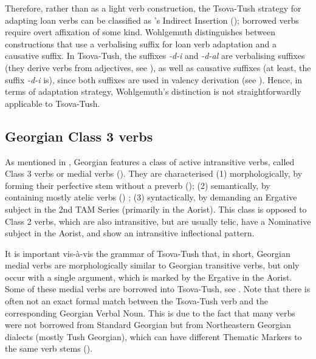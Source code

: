 Therefore, rather than as a light verb construction, the Tsova-Tush strategy for adapting loan verbs can be classified as \citeauthor{wohlgemut09loanverbtyp}'s Indirect Insertion (\citeyear[94]{wohlgemut09loanverbtyp}); borrowed verbs require overt affixation of some kind. Wohlgemuth distinguishes between constructions that use a verbalising suffix for loan verb adaptation and a causative suffix. In Tsova-Tush, the suffixes \textit{-d-i} and \textit{-d-al} are verbalising suffixes (they derive verbs from adjectives, see ), as well as causative suffixes (at least, the suffix \textit{-d-i} is), since both suffixes are used in valency derivation (see ). Hence, in terms of adaptation strategy, Wohlgemuth's distinction is not straightforwardly applicable to Tsova-Tush.



\subsection{Georgian Class 3 verbs} \label{loanverbmed}

As mentioned in , Georgian features a class of active intransitive verbs, called Class 3 verbs or medial verbs (\cites{holisky1981medial}). They are characterised (1) morphologically, by forming their perfective stem without a preverb (\cites{harris1981syntax}); (2) semantically, by containing mostly atelic verbs (\cites{gerardin2022valencegeo})
; (3) syntactically, by demanding an Ergative subject in the 2nd TAM Series (primarily in the Aorist). This class is opposed to Class 2 verbs, which are also intransitive, but are usually telic, have a Nominative subject in the Aorist, and show an intransitive inflectional pattern.

It is important vis-à-vis the grammar of Tsova-Tush that, in short, Georgian medial verbs are morphologically similar to Georgian transitive verbs, but only occur with a single argument, which is marked by the Ergative in the Aorist. Some of these medial verbs are borrowed into Tsova-Tush, see . Note that there is often not an exact formal match between the Tsova-Tush verb and the corresponding Georgian Verbal Noun. This is due to the fact that many verbs were not borrowed from Standard Georgian but from Northeastern Georgian dialects (mostly Tush Georgian), which can have different Thematic Markers to the same verb stems (\cite{uturgaidze60,kartulidialekt}).


